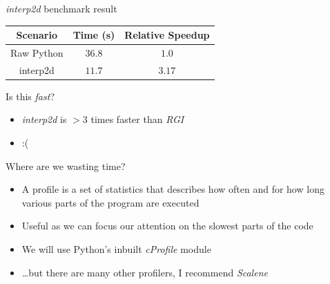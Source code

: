 \documentclass[12pt,xcolor=dvipsnames]{beamer}
\begin{document}
    \begin{frame}{\textit{interp2d} benchmark result}
        \begin{center}
        \begin{tabular}{ | c | c | c | }
            \hline
            Scenario & Time (s) & Relative Speedup \\
            \hline
            Raw Python & $36.8$ & $1.0$ \\
            interp2d & $11.7$ & $3.17$ \\
            \hline
        \end{tabular}
        \end{center}
    \end{frame}

    \begin{frame}{Is this \textit{fast}?}
        \begin{itemize}
            \item<1-> \textit{interp2d} is $>3$ times faster than \textit{RGI}
            \item<2-> :(
        \end{itemize}
    \end{frame}

    \begin{frame}{Where are we wasting time?}
        \begin{itemize}
            \item A profile is a set of statistics that describes how often and for how long various parts of the program are executed
            \item Useful as we can focus our attention on the slowest parts of the code
            \item We will use Python’s inbuilt \textit{cProfile} module
            \item \ldots but there are many other profilers, I recommend \textit{Scalene}
        \end{itemize}
    \end{frame}
\end{document}
